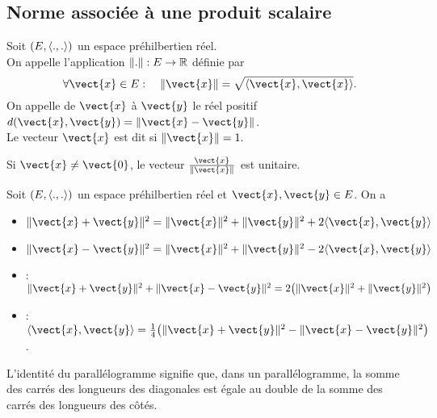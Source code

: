 \documentclass{book}
\begin{document}
\subsection{Norme associée à une produit scalaire}
\begin{Definition}
Soit $(E,\langle.,.\rangle)$ un espace préhilbertien réel.\\
On appelle  l'application $\mathopen\lVert . \mathclose\rVert: E\to \mathbb{R} $ définie par 
$$ \forall \vect{x}\in E:\quad  \norme{\vect{x}} =\sqrt{\PS{\vect{x}}{\vect{x}}}.$$
On appelle  de $\vect{x}$ à $\vect{y}$ le réel positif $d(\vect{x},\vect{y}) =\norme{\vect{x}-\vect{y}} $.\\ 
Le vecteur $\vect{x}$ est dit  si $\norme{\vect{x}}=1.$
\end{Definition}
\begin{Remarque}
Si $\vect{x}\neq \vect{0}$, le vecteur $\frac{\vect{x}}{\norme{\vect{x}}}$ est unitaire.
\end{Remarque}
\begin{Proposition}
Soit $(E,\langle.,.\rangle)$ un espace préhilbertien réel et $\vect{x},\vect{y}\in E$.
On a
\begin{itemize}
\item $\norme{\vect{x}+\vect{y}}^2 = \norme{\vect{x}}^2 + \norme{\vect{y}}^2 + 2\PS{\vect{x}}{\vect{y}}$
\item $\norme{\vect{x}-\vect{y}}^2 = \norme{\vect{x}}^2 + \norme{\vect{y}}^2 - 2\PS{\vect{x}}{\vect{y}}$
\item {}:
  $\norme{\vect{x}+\vect{y}}^2 + \norme{\vect{x}-\vect{y}}^2 = 2\bigl( \norme{\vect{x}}^2 + \norme{\vect{y}}^2 \bigr)$
\item {}:
  $\PS{\vect{x}}{\vect{y}} = \frac14 \bigl( \norme{\vect{x}+\vect{y}}^2 - \norme{\vect{x}-\vect{y}}^2 \bigr)$.
\end{itemize}
L'identité du parallélogramme signifie que, dans un parallélogramme, la somme des carrés des longueurs des diagonales est égale au double de la somme des carrés des longueurs des côtés.
\begin{center}
\end{center}
\end{Proposition}
\end{document}
